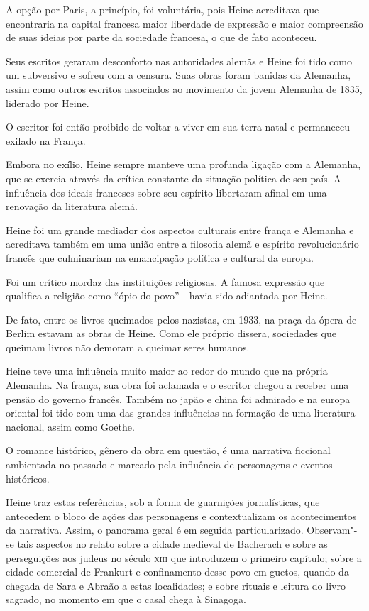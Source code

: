 \documentclass[12pt]{extarticle}
\begin{document}
A opção por Paris, a princípio, foi voluntária, pois Heine acreditava que encontraria na capital francesa maior liberdade de expressão e maior compreensão de suas ideias por parte da sociedade francesa, o que de fato aconteceu.

Seus escritos geraram desconforto nas autoridades alemãs e Heine foi tido como um subversivo e sofreu com a censura. Suas obras foram banidas da Alemanha, assim como outros escritos associados ao movimento da jovem Alemanha de 1835, liderado por Heine. 

O escritor foi então proibido de voltar a viver em sua terra natal e permaneceu exilado na França.

Embora no exílio, Heine sempre manteve uma profunda ligação com a Alemanha, que se exercia através da crítica constante da situação política de seu país. A influência dos ideais franceses sobre seu espírito libertaram afinal em uma renovação da literatura alemã.

Heine foi um grande mediador dos aspectos culturais entre frança e Alemanha e acreditava também em uma união entre a filosofia alemã e espírito revolucionário francês que culminariam na emancipação política e cultural da europa.

Foi um crítico mordaz das instituições religiosas. A famosa expressão que qualifica a religião como ``ópio do povo'' - havia sido adiantada por Heine. 

De fato, entre os livros queimados pelos nazistas, em 1933, na praça da ópera de Berlim estavam as obras de Heine. Como ele próprio dissera, sociedades que queimam livros não demoram a queimar seres humanos.

Heine teve uma influência muito maior ao redor do mundo que na própria Alemanha. Na frança, sua obra foi aclamada e o escritor chegou a receber uma pensão do governo francês. Também no japão e china foi admirado e na europa oriental foi tido com uma das grandes influências na formação de uma literatura nacional, assim como Goethe.

O romance histórico, gênero da obra em questão, é uma narrativa ficcional ambientada no passado e marcado pela influência de personagens e eventos históricos.


Heine traz estas referências, sob a forma de guarnições jornalísticas,
que antecedem o bloco de ações das personagens e contextualizam os
acontecimentos da narrativa. Assim, o panorama geral é em seguida
particularizado. Observam"-se tais aspectos no relato sobre a cidade
medieval de Bacherach e sobre as perseguições aos judeus no século \textsc{xiii}
que introduzem o primeiro capítulo; sobre a cidade comercial de Frankurt
e confinamento desse povo em guetos, quando da chegada de Sara e Abraão
a estas localidades; e sobre rituais e leitura do livro sagrado, no
momento em que o casal chega à Sinagoga.
\end{document}
